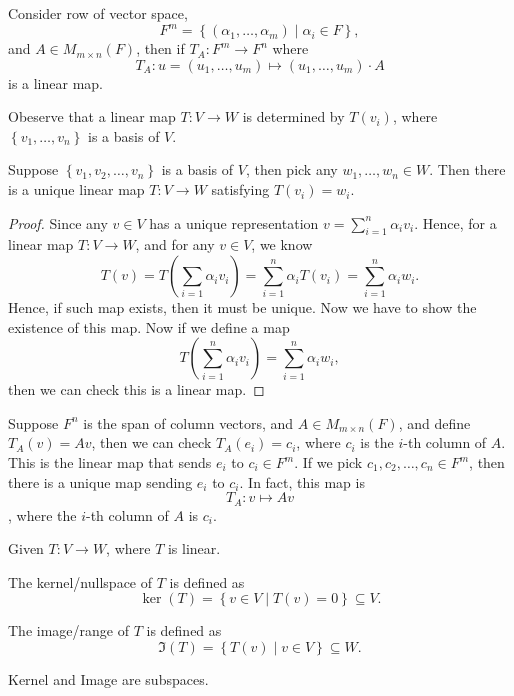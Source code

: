 \begin{eg}
    Consider row of vector space,
    \[
        F^m = \left\{ (\alpha _1, \dots , \alpha _m) \mid \alpha _i \in F \right\} ,
    \] and \(A \in M_{m \times n} (F)\), then if \(T_A: F^m \to F^n\) where
    \[
        T_A: u = (u_1, \dots , u_m) \mapsto (u_1, \dots , u_m) \cdot A
    \]  
    is a linear map.
\end{eg}

Obeserve that a linear map \(T:V \to W\) is determined by \(T(v_i)\), where \(\left\{ v_1, \dots , v_n \right\} \) is a basis of \(V\).

\begin{proposition} \label{prop: pick val of T(vi), linear map unique}
    Suppose \(\left\{ v_1, v_2, \dots , v_n \right\} \) is a basis of \(V\), then pick any \(w_1, \dots , w_n \in W\). Then there is a unique linear map \(T: V \to W\) satisfying \(T(v_i) = w_i\).     
\end{proposition}
\begin{proof}
    Since any \(v \in V\) has a unique representation \(v = \sum_{i=1}^n \alpha _i v_i \). Hence, for a linear map \(T:V \to W\), and for any \(v \in V\), we know
    \[
        T(v) = T \left( \sum_{i=1}\alpha _i v_i  \right) = \sum_{i=1}^n \alpha _i T(v_i) = \sum_{i=1}^n \alpha _i w_i.   
    \] 
    Hence, if such map exists, then it must be unique. Now we have to show the existence of this map. Now if we define a map 
    \[
        T \left( \sum_{i=1}^n \alpha _i v_i  \right) = \sum_{i=1}^n \alpha _i w_i,  
    \] then we can check this is a linear map.
\end{proof}

\begin{eg}
    Suppose \(F^n\) is the span of column vectors, and \(A \in M_{m \times n}(F)\), and define \(T_A(v) = Av\), then we can check \(T_A (e_i) = c_i\), where \(c_i\) is the \(i\)-th column of \(A\).  This is the linear map that sends \(e_i\) to \(c_i \in F^m\). If we pick \(c_1, c_2, \dots , c_n \in F^m\), then there is a unique map sending \(e_i\) to \(c_i\). In fact, this map is 
    \[
        T_A : v \mapsto Av
    \], where the \(i\)-th column of \(A\) is \(c_i\).         

\end{eg}

\begin{definition*}
Given \(T: V \to W\), where \(T\) is linear.
\begin{definition}[Kernel] \label{def: kernel}
The kernel/nullspace of \(T\) is defined as
    \[
        \ker (T) = \left\{ v \in V \mid T(v) = 0 \right\} \subseteq V.
    \]   
\end{definition}

\begin{definition}[Image] \label{def: image}
The image/range of \(T\) is defined as 
    \[
        \Im (T) = \left\{ T(v) \mid v \in V \right\} \subseteq W. 
    \]
\end{definition}
\end{definition*}

\begin{remark}
    Kernel and Image are subspaces.
\end{remark}